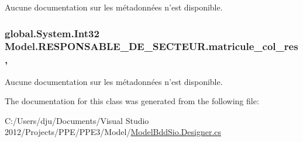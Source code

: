 Aucune documentation sur les métadonnées n'est disponible. 

\hypertarget{class_model_1_1_r_e_s_p_o_n_s_a_b_l_e___d_e___s_e_c_t_e_u_r_af326e57ab9a6b071e90fdc7397891569}{
\subsubsection[{matricule\-\_\-col\-\_\-res}]{\setlength{\rightskip}{0pt plus 5cm}global.\-System.\-Int32 Model.\-R\-E\-S\-P\-O\-N\-S\-A\-B\-L\-E\-\_\-\-D\-E\-\_\-\-S\-E\-C\-T\-E\-U\-R.\-matricule\-\_\-col\-\_\-res\hspace{0.3cm}{\ttfamily [get]}, {\ttfamily [set]}}}\label{class_model_1_1_r_e_s_p_o_n_s_a_b_l_e___d_e___s_e_c_t_e_u_r_af326e57ab9a6b071e90fdc7397891569}


Aucune documentation sur les métadonnées n'est disponible. 



The documentation for this class was generated from the following file\-:\begin{DoxyCompactItemize}
\item 
C\-:/\-Users/dju/\-Documents/\-Visual Studio 2012/\-Projects/\-P\-P\-E/\-P\-P\-E3/\-Model/\hyperlink{_model_bdd_sio_8_designer_8cs}{Model\-Bdd\-Sio.\-Designer.\-cs}\end{DoxyCompactItemize}
